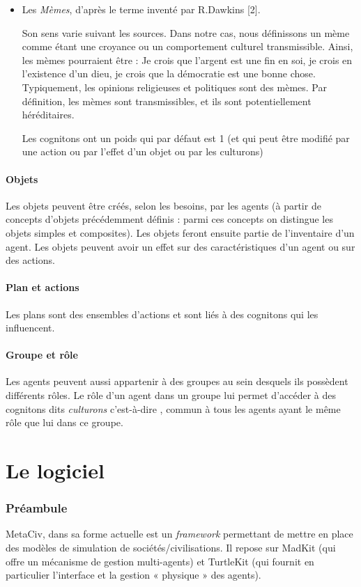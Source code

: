 \documentclass[a4paper,oneside,12 pt]{article}
\begin{document}
\begin{itemize}
\item 	Les \textit{Mèmes}, d'après le terme inventé par R.Dawkins [2].

 Son sens varie suivant les sources. Dans notre cas, nous définissons un mème comme étant une croyance ou un comportement culturel transmissible. Ainsi, les mèmes pourraient être : Je crois que l'argent est une fin en soi, je crois en l'existence d'un dieu, je crois que la démocratie est une bonne chose. Typiquement, les opinions religieuses et politiques sont des mèmes. Par définition, les mèmes sont transmissibles, et ils sont potentiellement héréditaires.
	
Les cognitons ont un poids qui par défaut est 1 (et qui peut être modifié par une action ou  par l'effet d'un objet ou par les culturons)
\end{itemize}

\subsection{Objets}
Les objets peuvent être créés, selon les besoins, par les agents (à partir de concepts d'objets précédemment définis : parmi ces concepts on distingue les objets simples et composites). Les objets feront ensuite partie de l'inventaire d'un agent. Les objets peuvent avoir un effet sur des caractéristiques d'un agent ou sur des actions. 

\subsection{Plan et actions}
Les plans sont des ensembles d'actions et sont liés à des cognitons qui les influencent.

\subsection{Groupe et rôle}
Les agents peuvent aussi appartenir à des groupes au sein desquels ils possèdent différents rôles. Le rôle d'un agent dans un groupe lui permet d'accéder à des cognitons dits \textit{ culturons} c'est-à-dire , commun à tous les agents ayant le même rôle que lui dans ce groupe. 
\newpage
\part{Le  logiciel}
\section{Préambule}
MetaCiv, dans sa forme actuelle est un \textit{framework} permettant de mettre en place des modèles de simulation de sociétés/civilisations. Il repose sur MadKit (qui offre un mécanisme de gestion multi-agents) et TurtleKit (qui fournit en particulier l’interface et la gestion « physique » des agents).
\end{document}
